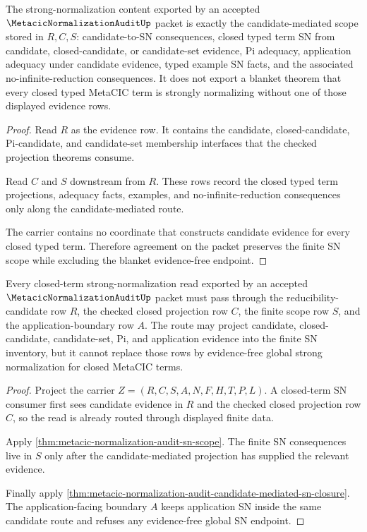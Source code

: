 \begin{theorem}
\label{thm:metacic-normalization-audit-sn-scope}
The strong-normalization content exported by an accepted $\MetacicNormalizationAuditUp$ packet is exactly the candidate-mediated scope stored in $R,C,S$: candidate-to-SN consequences, closed typed term SN from candidate, closed-candidate, or candidate-set evidence, Pi adequacy, application adequacy under candidate evidence, typed example SN facts, and the associated no-infinite-reduction consequences. It does not export a blanket theorem that every closed typed MetaCIC term is strongly normalizing without one of those displayed evidence rows.
\end{theorem}
\begin{proof}
Read $R$ as the evidence row. It contains the candidate, closed-candidate, Pi-candidate, and candidate-set membership interfaces that the checked projection theorems consume.

Read $C$ and $S$ downstream from $R$. These rows record the closed typed term projections, adequacy facts, examples, and no-infinite-reduction consequences only along the candidate-mediated route.

The carrier contains no coordinate that constructs candidate evidence for every closed typed term. Therefore agreement on the packet preserves the finite SN scope while excluding the blanket evidence-free endpoint.
\end{proof}

\begin{theorem}
\label{thm:metacic-normalization-audit-closed-term-projection-route}
Every closed-term strong-normalization read exported by an accepted $\MetacicNormalizationAuditUp$ packet must pass through the reducibility-candidate row $R$, the checked closed projection row $C$, the finite scope row $S$, and the application-boundary row $A$. The route may project candidate, closed-candidate, candidate-set, Pi, and application evidence into the finite SN inventory, but it cannot replace those rows by evidence-free global strong normalization for closed MetaCIC terms.
\end{theorem}
\begin{proof}
Project the carrier $Z=(R,C,S,A,N,F,H,T,P,L)$. A closed-term SN consumer first sees candidate evidence in $R$ and the checked closed projection row $C$, so the read is already routed through displayed finite data.

Apply \autoref{thm:metacic-normalization-audit-sn-scope}. The finite SN consequences live in $S$ only after the candidate-mediated projection has supplied the relevant evidence.

Finally apply \autoref{thm:metacic-normalization-audit-candidate-mediated-sn-closure}. The application-facing boundary $A$ keeps application SN inside the same candidate route and refuses any evidence-free global SN endpoint.
\end{proof}

